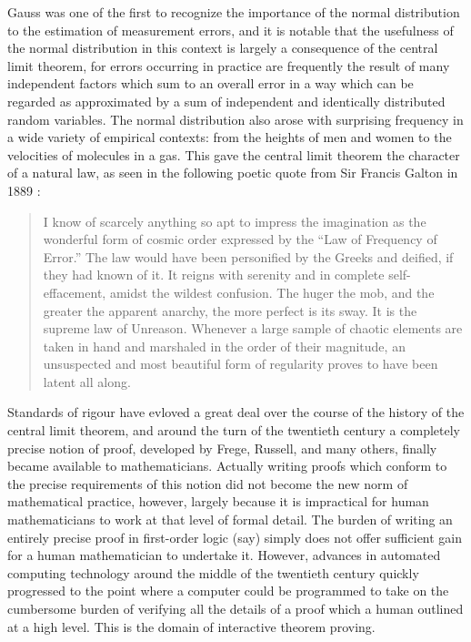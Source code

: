 \documentclass{article}
\theoremstyle{definition}
\begin{document}
Gauss was one of the first to recognize the importance of the normal distribution to the estimation of measurement errors, and it is notable that the usefulness of the normal distribution in this context is largely a consequence of the central limit theorem, for errors occurring in practice are frequently the result of many independent factors which sum to an overall error in a way which can be regarded as approximated by a sum of independent and identically distributed random variables. The normal distribution also arose with surprising frequency in a wide variety of empirical contexts: from the heights of men and women to the velocities of molecules in a gas. This gave the central limit theorem the character of a natural law, as seen in the following poetic quote from Sir Francis Galton in 1889 \cite{galton}:
\begin{quote}
 I know of scarcely anything so apt to impress the imagination as the wonderful form of cosmic order expressed by the ``Law of Frequency of Error.'' The law would have been personified by the Greeks and deified, if they had known of it. It reigns with serenity and in complete self-effacement, amidst the wildest confusion. The huger the mob, and the greater the apparent anarchy, the more perfect is its sway. It is the supreme law of Unreason. Whenever a large sample of chaotic elements are taken in hand and marshaled in the order of their magnitude, an unsuspected and most beautiful form of regularity proves to have been latent all along.
\end{quote}

Standards of rigour have evloved a great deal over the course of the history of the central limit theorem, and around the turn of the twentieth century a completely precise notion of proof, developed by Frege, Russell, and many others, finally became available to mathematicians. Actually writing proofs which conform to the precise requirements of this notion did not become the new norm of mathematical practice, however, largely because it is impractical for human mathematicians to work at that level of formal detail. The burden of writing an entirely precise proof in first-order logic (say) simply does not offer sufficient gain for a human mathematician to undertake it. However, advances in automated computing technology around the middle of the twentieth century quickly progressed to the point where a computer could be programmed to take on the cumbersome burden of verifying all the details of a proof which a human outlined at a high level. This is the domain of interactive theorem proving.
\end{document}
